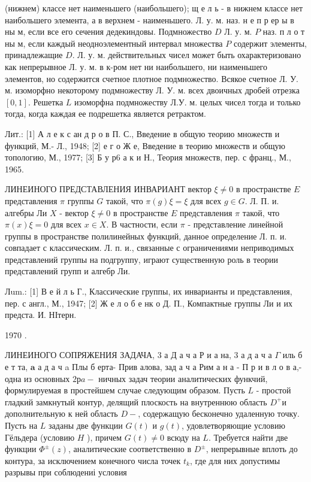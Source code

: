 \documentclass[10pt]{article}
\begin{document}
(нижнем) классе нет наименьшего (наибольшего); щ е л ь - в нижнем классе нет наибольшего элемента, а в верхнем - наименьшего. Л. у. м. наз. н е п р ер ы в ны м, если все его сечения дедекиндовы. Подмножество $D$ Л. у. м. $P$ наз. п л о т ны м, если каждый неодноэлементный интервал множества $P$ содержит элементы, принадлежащие $D$. Л. у. м. действительных чисел может быть охарактеризовано как непрерывное Л. у. м. в к-ром нет ни наибольшего, ни наименьшего элементов, но содержится счетное плотное подмножество. Всякое счетное Л. У. м. изоморфно некоторому подмножеству Л. У. м. всех двоичных дробей отрезка $[0,1]$. Решетка $L$ изоморфна подмножеству Л.У. м. целых чисел тогда и только тогда, когда каждая ее подрешетка является ретрактом.



Лит.: [1] А л е к с ан д р о в П. С., Введение в общую теорию множеств и функций, М.- Л., 1948; [2] е г о Ж е, Введение в теорию множеств и общую топологию, М., 1977; [3] Б у р6 а к и Н., Теория множеств, пер. с франц., М., 1965.



ЛИНЕИНОГО ПРЕДСТАВЛЕНИЯ ИНВАРИАНТ вектор $\xi \neq 0$ в пространстве $E$ представления $\pi$ группы $G$ такой, что $\pi(g) \xi=\xi$ для всех $g \in G$. Л. П. и. алгебры Ли $X$ - вектор $\xi \neq 0$ в пространстве $E$ представления $\pi$ такой, что $\pi(x) \xi=0$ для всех $x \in X$. В частности, если $\pi$ - представление линейной группы в пространстве полилинейных функций, данное определение Л. п. и. совпадает с классическим. Л. п. и., связанные с ограничениями неприводимых представлений группы на подгруппу, играют существенную роль в теории представлений групп и алгебр Ли.



Лum.: [1] В е й л ь Г., Классические группы, их инварианты и представления, пер. с англ., М., 1947; [2] Ж е л о б е нк о Д. П., Компактные группы Ли и их предста. И. НІтерн.

1970 .



ЛИНЕИНОГО СОПРЯЖЕНИЯ ЗАДАЧА, 3 а Д а ч а Р и а на, 3 а д а ч а $\Gamma$ иль б е т та, $\mathbf{a}$ а д а ч a Плы б ерта- Прив алова, зад а ч а Рим а н а - П р и в л о в а,- одна из основных $2 р a-$ ничных задач теории аналитических функчий, формулируемая в простейшем случае следующим образом. Пусть $L$ - простой гладкий замкнутый контур, делящий плоскость на внутреннюю область $D^{+}$и дополнительную к ней область $D-$, содержащую бесконечно удаленную точку. Пусть на $L$ заданы две функции $G(t)$ и $g(t)$, удовлетворяющие условию Гёльдера (условию $H$ ), причем $G(t) \neq 0$ всюду на $L$. Требуется найти две функции $\Phi^{ \pm}(z)$, аналитические соответственно в $D^{ \pm}$, непрерывные вплоть до контура, за исключением конечного числа точек $t_{k}$, где для них допустимы разрывы при соблюдениі условия
\end{document}

